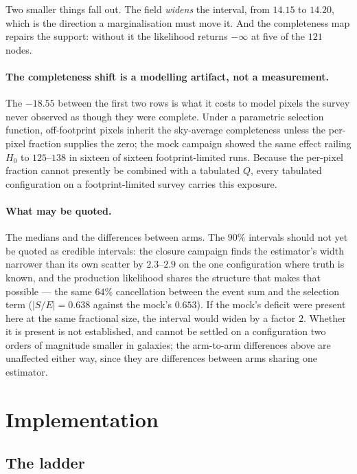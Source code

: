\documentclass[11pt]{article}
\theoremstyle{definition}
\theoremstyle{remark}
\begin{document}
Two smaller things fall out. The field \emph{widens} the interval, from $14.15$
to $14.20$, which is the direction a marginalisation must move it. And the
completeness map repairs the support: without it the likelihood returns
$-\infty$ at five of the $121$ nodes.

\paragraph{The completeness shift is a modelling artifact, not a measurement.}
The $-18.55$ between the first two rows is what it costs to model pixels the
survey never observed as though they were complete. Under a parametric
selection function, off-footprint pixels inherit the sky-average completeness
unless the per-pixel fraction supplies the zero; the mock campaign showed the
same effect railing $H_0$ to $125$--$138$ in sixteen of sixteen
footprint-limited runs. Because the per-pixel fraction cannot presently be
combined with a tabulated $Q$, every tabulated configuration on a
footprint-limited survey carries this exposure.

\paragraph{What may be quoted.} The medians and the differences between arms.
The $90\%$ intervals should not yet be quoted as credible intervals: the
closure campaign finds the estimator's width narrower than its own scatter by
$2.3$--$2.9$ on the one configuration where truth is known, and the production
likelihood shares the structure that makes that possible --- the same $64\%$
cancellation between the event sum and the selection term ($|S/E|=0.638$ against
the mock's $0.653$). If the mock's deficit were present here at the same
fractional size, the interval would widen by a factor $2$. Whether it is present
is not established, and cannot be settled on a configuration two orders of
magnitude smaller in galaxies; the arm-to-arm differences above are unaffected
either way, since they are differences between arms sharing one estimator.

\section{Implementation}
\label{sec:impl}

\subsection{The ladder}
\end{document}

